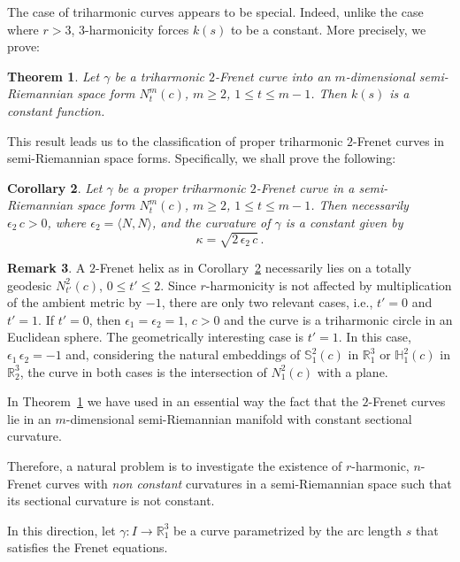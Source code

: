 \documentclass[11pt]{amsart}
\theoremstyle{plain}
\newtheorem{theorem}                {Theorem}      [section]
\newtheorem{corollary}    [theorem]  {Corollary}
\theoremstyle{definition}
\newtheorem{remark}       [theorem]  {Remark}
\numberwithin{equation}{section}
\def \R{{\mathbb R}}
\def \s {{\mathbb S}}
\def \h {{\mathbb H}}
\begin{document}
The case of triharmonic curves appears to be special. Indeed, unlike the case where $r>3$, $3$-harmonicity forces $k(s)$ to be a constant. More precisely, we prove:
\begin{theorem}\label{Prop-3-harmon+2-Frenet-implica-k-costante} Let $\gamma$ be a triharmonic $2$-Frenet curve into an $m$-dimensional semi-Riemannian space form $N^m_t(c)$, $m \geq 2$, $1 \leq t \leq m-1$. Then $k(s)$ is a constant function.
\end{theorem}
This result leads us to the classification of proper triharmonic $2$-Frenet curves in semi-Riemannian space forms. Specifically, we shall prove the following:
\begin{corollary}\label{Th-classif-triharm-space-form}
Let $\gamma$ be a proper triharmonic $2$-Frenet curve in a semi-Riemannian space form $N^m_t(c)$, $m \geq 2$, $1 \leq t \leq m-1$. Then necessarily $\epsilon_2 \,c>0$, where $\epsilon_2=\langle N,N\rangle$, and the curvature of $\gamma$ is a constant given by
\[
\kappa= \sqrt{2 \,\epsilon_2\,c}\,.
\]
\end{corollary}
\begin{remark}
A $2$-Frenet helix as in Corollary~\ref{Th-classif-triharm-space-form} necessarily lies on a totally geodesic  $N^2_{t'}(c)$, $0 \leq t' \leq 2$. Since $r$-harmonicity is not affected by multiplication of the ambient metric by $-1$, there are only two relevant cases, i.e., $t'=0$ and $t'=1$. If $t'=0$, then $\epsilon_1=\epsilon_2=1$, $c>0$ and the curve is a triharmonic circle in an Euclidean sphere. The geometrically interesting case is $t'=1$. In this case, $\epsilon_1\,\epsilon_2=-1$ and, considering the natural embeddings of $\s^2_1(c)$ in $\R^3_1$ or $\h^2_1(c)$ in $\R^3_2$, the curve in both cases is the intersection of $N^2_1(c)$ with a plane.
\end{remark}
\vspace{2mm}

In Theorem~\ref{Prop-3-harmon+2-Frenet-implica-k-costante} we have used in an essential way the fact that the \( 2 \)-Frenet curves lie in an \( m \)-dimensional semi-Riemannian manifold with constant sectional curvature. 

Therefore, a natural problem is to investigate the existence of \( r \)-harmonic, \( n \)-Frenet curves with \textit{non constant} curvatures in a semi-Riemannian space such that its sectional curvature is not constant. 

In this direction, let \( \gamma: I \to \R^3_1 \) be a curve parametrized by the arc length \( s \) that satisfies the Frenet equations.
\end{document}
